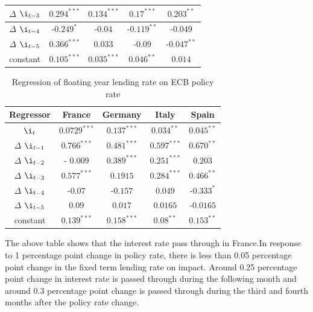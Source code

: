 \documentclass[12pt]{article}
\numberwithin{equation}{section}
\begin{document}
\begin{appendix}
\begin {table}[H]
\begin{center}
\begin{tabular}{||c c c c c||}
		\hline
		$\Delta$ $\i_{t-3}$	&  $0.294^{***}$ &  $0.134^{***}$& $0.17^{***}$& $0.203^{**}$ \\
		\hline
		$\Delta$  $\i_{t-4}$&-$0.249^{*}$&-$0.04$ & -$0.119^{**}$& -$0.049$ \\  
		\hline
		$\Delta$  $\i_{t-5}$&$0.366^{***}$&$0.033$ & -$0.09$& -$0.047^{**}$ \\  
		\hline
		constant&$0.105^{***}$ &$0.035^{***}$& $0.046^{**}$ & $0.014$\\ 
		
		\hline
			
		\end{tabular}
\end{center}
\end {table}




\begin {table}[H]
\caption {Regression of floating year lending rate on ECB policy rate} \label{tab:title} 
\begin{center}
	\begin{tabular}{||c c c c c||} 
		\hline
		Regressor &  France & Germany& Italy & Spain \\ [0.5ex] 
		\hline\hline
		$\i_{t}$ & $0.0729^{***}$& $0.137^{***}$ & $0.034^{**}$& $0.045^{**}$ \\ 
		\hline
		$\Delta$ $\i_{t-1}$& $0.766^{***}$& $0.481^{***}$& $0.597^{***}$& $0.670^{**}$ \\ 
		\hline
		$\Delta$ $\i_{t-2}$&- $0.009$ &$0.389^{***}$& $0.251^{***}$& $0.203$ \\
		
		\hline
		$\Delta$ $\i_{t-3}$	&  $0.577^{***}$ &  $0.1915$& $0.284^{***}$& $0.466^{**}$ \\
		\hline
		$\Delta$  $\i_{t-4}$&-$0.07$&-$0.157$ & $0.049$& -$0.333^{*}$ \\  
		\hline
		$\Delta$  $\i_{t-5}$&$0.09$&$0.017$ & $0.0165$& -$0.0165$ \\  
		\hline
		constant&$0.139^{***}$ &$0.158^{***}$& $0.08^{**}$ & $0.153^{**}$\\ 
		
		\hline
		
	\end{tabular}
\end{center}
\end {table}


The above table shows that the interest rate pass through in France.In response to 1 percentage point change in policy rate, there is less than 0.05 percentage point change in the fixed term lending rate on impact.  Around 0.25 percentage point change in interest rate is passed through during the following month and around 0.3 percentage point change is passed through during the third and fourth months after the policy rate change.


\end{appendix}
\end{document}

